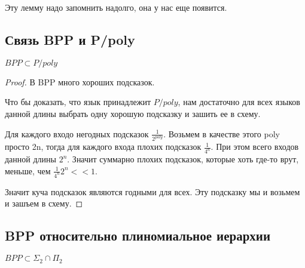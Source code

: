 Эту лемму надо запомнить надолго, она у нас еще появится.

\subsection{Связь BPP и P/poly}

\begin{theorem}
	$BPP \subset P/poly$\\
\end{theorem}

\begin{proof}
	В BPP много хороших подсказок. 

	Что бы доказать, что язык принадлежит $P/poly$, нам достаточно для всех языков 
	данной длины выбрать одну хорошую подсказку и зашить ее в схему.

	Для каждого входо негодных подсказок $\frac{1}{2^{poly}} $. Возьмем в качестве этого poly просто 2n, 
	тогда для каждого входа плохих подсказок $\frac{1}{4^n}$. При этом всего входов данной длины $2^n$. Значит 
	суммарно плохих подсказок, которые хоть где-то врут, меньше, чем $\frac{1}{4^n}2^n << 1$.

	Значит куча подсказок являются годными для всех. Эту подсказку мы и возьмем и зашъем в схему.
\end{proof}

\subsection{BPP относительно плиномиальное иерархии}
\begin {theorem}
	$BPP \subset \Sigma_2 \cap \Pi_2$\\
\end{theorem}

